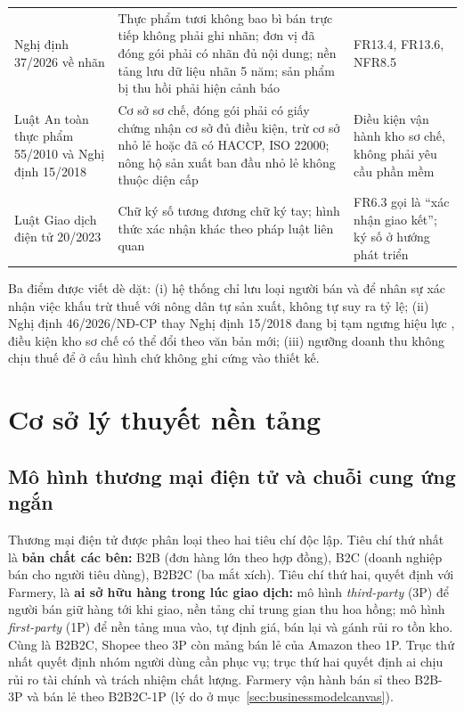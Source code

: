 \begin{longtable}{L{3.50cm} L{6.70cm} L{4.70cm}}
Nghị định 37/2026 về nhãn \parencite{nd37_2026} & Thực phẩm tươi không bao bì bán trực tiếp không phải ghi nhãn; đơn vị đã đóng gói phải có nhãn đủ nội dung; nền tảng lưu dữ liệu nhãn 5 năm; sản phẩm bị thu hồi phải hiện cảnh báo & FR13.4, FR13.6, NFR8.5 \\
Luật An toàn thực phẩm 55/2010 và Nghị định 15/2018 \parencite{luat_attp_2010, nd15_2018} & Cơ sở sơ chế, đóng gói phải có giấy chứng nhận cơ sở đủ điều kiện, trừ cơ sở nhỏ lẻ hoặc đã có HACCP, ISO 22000; nông hộ sản xuất ban đầu nhỏ lẻ không thuộc diện cấp & Điều kiện vận hành kho sơ chế, không phải yêu cầu phần mềm \\
Luật Giao dịch điện tử 20/2023 \parencite{luatgddt2023} & Chữ ký số tương đương chữ ký tay; hình thức xác nhận khác theo pháp luật liên quan & FR6.3 gọi là ``xác nhận giao kết''; ký số ở hướng phát triển \\
\end{longtable}
\endgroup

Ba điểm được viết dè dặt: (i) hệ thống chỉ lưu loại người bán và để nhân sự xác nhận việc khấu trừ thuế với nông dân tự sản xuất, không tự suy ra tỷ lệ; (ii) Nghị định 46/2026/NĐ-CP thay Nghị định 15/2018 đang bị tạm ngưng hiệu lực \parencite{nq15_2026}, điều kiện kho sơ chế có thể đổi theo văn bản mới; (iii) ngưỡng doanh thu không chịu thuế \parencite{nd141_2026} để ở cấu hình chứ không ghi cứng vào thiết kế.

\section{Cơ sở lý thuyết nền tảng}
\label{sec:lythuyet}

\subsection{Mô hình thương mại điện tử và chuỗi cung ứng ngắn}
\label{subsec:haitruc}

Thương mại điện tử được phân loại theo hai tiêu chí độc lập. Tiêu chí thứ nhất là \textbf{bản chất các bên:} B2B (đơn hàng lớn theo hợp đồng), B2C (doanh nghiệp bán cho người tiêu dùng), B2B2C (ba mắt xích). Tiêu chí thứ hai, quyết định với Farmery, là \textbf{ai sở hữu hàng trong lúc giao dịch:} mô hình \emph{third-party} (3P) để người bán giữ hàng tới khi giao, nền tảng chỉ trung gian thu hoa hồng; mô hình \emph{first-party} (1P) để nền tảng mua vào, tự định giá, bán lại và gánh rủi ro tồn kho. Cùng là B2B2C, Shopee theo 3P còn mảng bán lẻ của Amazon theo 1P. Trục thứ nhất quyết định nhóm người dùng cần phục vụ; trục thứ hai quyết định ai chịu rủi ro tài chính và trách nhiệm chất lượng. Farmery vận hành bán sỉ theo B2B-3P và bán lẻ theo B2B2C-1P (lý do ở mục~\ref{sec:businessmodelcanvas}).

